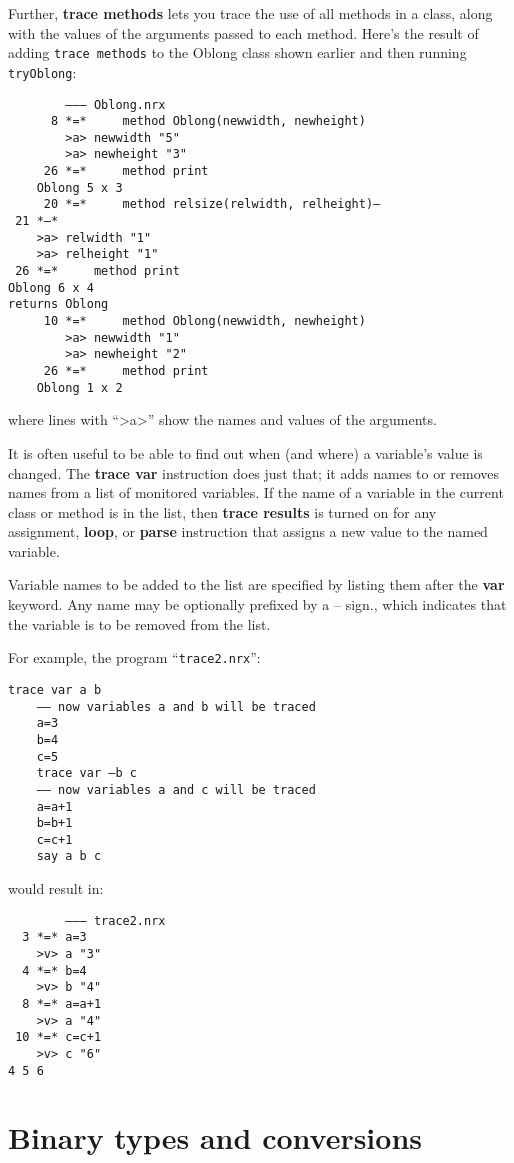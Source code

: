 Further, \textbf{trace methods} lets you trace the use of all methods in a
class, along with the values of the arguments passed to each
method. Here’s the result of adding \texttt{trace methods} to the Oblong class
shown earlier and then running \texttt{tryOblong}:
\begin{verbatim}
        ––– Oblong.nrx
      8 *=*     method Oblong(newwidth, newheight)
        >a> newwidth "5"
        >a> newheight "3"
     26 *=*     method print
    Oblong 5 x 3
     20 *=*     method relsize(relwidth, relheight)–
 21 *–*
    >a> relwidth "1"
    >a> relheight "1"
 26 *=*     method print
Oblong 6 x 4
returns Oblong
     10 *=*     method Oblong(newwidth, newheight)
        >a> newwidth "1"
        >a> newheight "2"
     26 *=*     method print
    Oblong 1 x 2
\end{verbatim}
where lines with “>a>” show the names and values of the arguments.

It is often useful to be able to find out when (and where) a variable’s value is changed. The \textbf{trace var} instruction does just that; it adds names to or removes names from a list of monitored variables. If the name of a variable in the current class or method is in the list, then \textbf{trace results} is turned on for any assignment, \textbf{loop}, or \textbf{parse} instruction that assigns a new value to the named variable.

Variable names to be added to the list are specified by listing them after the \textbf{var} keyword. Any name may be optionally prefixed by a – sign., which indicates that the variable is to be removed from the list.

For example, the program “\texttt{trace2.nrx}”:
\begin{lstlisting}[label=trace2,caption=trace2.nrx]
    trace var a b
    –– now variables a and b will be traced
    a=3
    b=4
    c=5
    trace var –b c
    –– now variables a and c will be traced
    a=a+1
    b=b+1
    c=c+1
    say a b c
\end{lstlisting}
would result in:
\begin{verbatim}
        ––– trace2.nrx
  3 *=* a=3
    >v> a "3"
  4 *=* b=4
    >v> b "4"
  8 *=* a=a+1
    >v> a "4"
 10 *=* c=c+1
    >v> c "6"
4 5 6
\end{verbatim}

\section{Binary types and conversions}\label{binarith}

